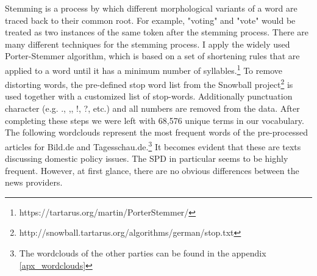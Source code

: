 \documentclass[12pt,a4paper,notitlepage]{article}
\begin{document}
Stemming is a process by which different morphological variants of a word are traced back to their common root. For example, "voting" and "vote" would be treated as two instances of the same token after the stemming process. There are many different techniques for the stemming process. I apply the widely used Porter-Stemmer algorithm, which is based on a set of shortening rules that are applied to a word until it has a minimum number of syllables.\footnote{https://tartarus.org/martin/PorterStemmer/} To remove distorting words, the pre-defined stop word list from the Snowball project\footnote{http://snowball.tartarus.org/algorithms/german/stop.txt} is used together with a customized list of stop-words. Additionally punctuation character (e.g. ., ,, !, ?, etc.) and all numbers are removed from the data. After completing these steps we were left with 68,576 unique terms in our vocabulary. The following wordclouds represent the most frequent words of the pre-processed articles for Bild.de and Tagesschau.de.\footnote{The wordclouds of the other parties can be found in the appendix \ref{apx_wordclouds}} It becomes evident that these are texts discussing domestic policy issues. The SPD in particular seems to be highly frequent. However, at first glance, there are no obvious differences between the news providers.  
\end{document}
